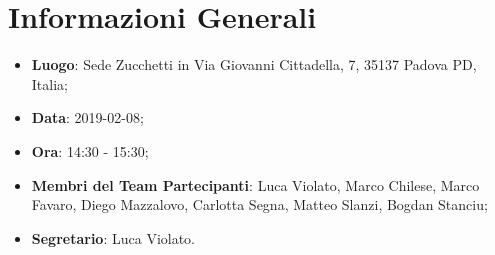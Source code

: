 \section{Informazioni Generali}
\begin{itemize}
	\item \textbf{Luogo}: Sede Zucchetti in Via Giovanni Cittadella, 7, 35137 Padova PD, Italia; 
	\item \textbf{Data}: 2019-02-08; 
	\item \textbf{Ora}: 14:30 - 15:30; 
	\item \textbf{Membri del Team Partecipanti}: Luca Violato, Marco Chilese, Marco Favaro, Diego Mazzalovo, Carlotta Segna, Matteo Slanzi, Bogdan Stanciu; 
	\item \textbf{Segretario}: Luca Violato. 
\end{itemize}